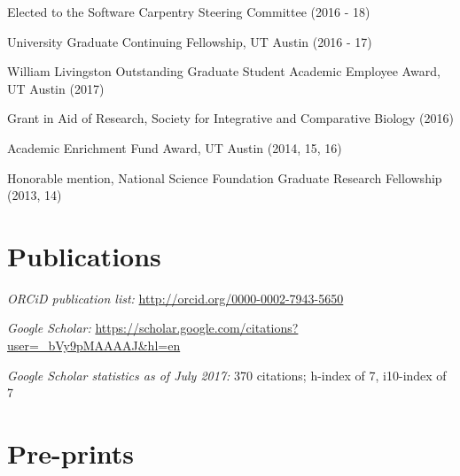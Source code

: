 \documentclass[margin,line]{resume}
\begin{document}
\begin{resume}
\begin{description}[leftmargin=0pt]  
\setlength{\itemsep}{1pt} 
\item[] Elected to the Software Carpentry Steering Committee (2016 - 18)
\item[] University Graduate Continuing Fellowship, UT Austin (2016 - 17)
\item[] William Livingston Outstanding Graduate Student Academic Employee Award, UT Austin (2017)
\item[] Grant in Aid of Research,  Society for Integrative and Comparative Biology (2016)
\item[] Academic Enrichment Fund Award, UT Austin (2014, 15, 16)
\item[] Honorable mention, National Science Foundation Graduate Research Fellowship (2013, 14)
\end{description}




\section{\mysidestyle Publications}
    
\begin{description}[leftmargin=0pt]  
\setlength{\itemsep}{2pt} 
\item[] {\em ORCiD publication list:} \url{http://orcid.org/0000-0002-7943-5650}
\item[] {\em Google Scholar:} \url{https://scholar.google.com/citations?user=_bVy9pMAAAAJ&hl=en}
\item[] {\em Google Scholar statistics as of July 2017:} 370 citations; h-index of 7, i10-index of 7
\end{description}

\section{\mysidestyle Pre-prints}


\end{resume}
\end{document}
